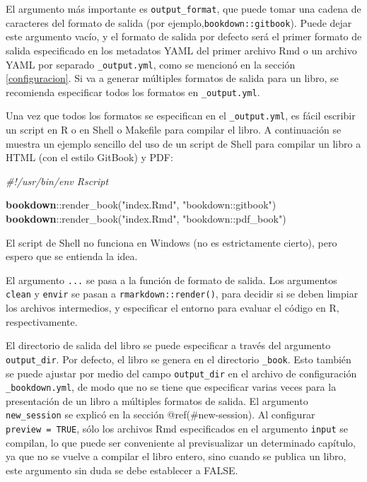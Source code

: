 \documentclass[12pt,]{krantz}
\makeatletter
\newenvironment{Shaded}{\begin{snugshade}}{\end{snugshade}}
\newcommand{\KeywordTok}[1]{\textcolor[rgb]{0.13,0.29,0.53}{\textbf{{#1}}}}
\newcommand{\StringTok}[1]{\textcolor[rgb]{0.31,0.60,0.02}{{#1}}}
\newcommand{\CommentTok}[1]{\textcolor[rgb]{0.56,0.35,0.01}{\textit{{#1}}}}
\newcommand{\NormalTok}[1]{{#1}}
\newenvironment{kframe}{%
\medskip{}
\setlength{\fboxsep}{.8em}
 \def\at@end@of@kframe{}%
 \ifinner\ifhmode%
  \def\at@end@of@kframe{\end{minipage}}%
  \begin{minipage}{\columnwidth}%
 \fi\fi%
 \def\FrameCommand##1{\hskip\@totalleftmargin \hskip-\fboxsep
 \colorbox{shadecolor}{##1}\hskip-\fboxsep
     \hskip-\linewidth \hskip-\@totalleftmargin \hskip\columnwidth}%
 \MakeFramed {\advance\hsize-\width
   \@totalleftmargin\z@ \linewidth\hsize
   \@setminipage}}%
 {\par\unskip\endMakeFramed%
 \at@end@of@kframe}
\renewenvironment{Shaded}{\begin{kframe}}{\end{kframe}}
\theoremstyle{definition}
\theoremstyle{definition}
\theoremstyle{remark}
\makeatother
\begin{document}
El argumento más importante es \texttt{output\_format}, que puede tomar
una cadena de caracteres del formato de salida (por
ejemplo,\texttt{\textquotesingle{}bookdown::gitbook\textquotesingle{}}).
Puede dejar este argumento vacío, y el formato de salida por defecto
será el primer formato de salida especificado en los metadatos YAML del
primer archivo Rmd o un archivo YAML por separado \texttt{\_output.yml},
como se mencionó en la sección \ref{configuracion}. Si va a generar
múltiples formatos de salida para un libro, se recomienda especificar
todos los formatos en \texttt{\_output.yml}.

Una vez que todos los formatos se especifican en el
\texttt{\_output.yml}, es fácil escribir un script en R o en Shell o
Makefile para compilar el libro. A continuación se muestra un ejemplo
sencillo del uso de un script de Shell para compilar un libro a HTML
(con el estilo GitBook) y PDF:

\begin{Shaded}
\begin{Highlighting}[]
\CommentTok{#!/usr/bin/env Rscript}

\KeywordTok{bookdown}\NormalTok{::render_book(}\StringTok{"index.Rmd"}\NormalTok{, }\StringTok{"bookdown::gitbook"}\NormalTok{)}
\KeywordTok{bookdown}\NormalTok{::render_book(}\StringTok{"index.Rmd"}\NormalTok{, }\StringTok{"bookdown::pdf_book"}\NormalTok{)}
\end{Highlighting}
\end{Shaded}

El script de Shell no funciona en Windows (no es estrictamente cierto),
pero espero que se entienda la idea.

El argumento \texttt{...} se pasa a la función de formato de salida. Los
argumentos \texttt{clean} y \texttt{envir} se pasan a
\texttt{rmarkdown::render()}, para decidir si se deben limpiar los
archivos intermedios, y especificar el entorno para evaluar el código en
R, respectivamente.

El directorio de salida del libro se puede especificar a través del
argumento \texttt{output\_dir}. Por defecto, el libro se genera en el
directorio \texttt{\_book}. Esto también se puede ajustar por medio del
campo \texttt{output\_dir} en el archivo de configuración
\texttt{\_bookdown.yml}, de modo que no se tiene que especificar varias
veces para la presentación de un libro a múltiples formatos de salida.
El argumento \texttt{new\_session} se explicó en la sección
@ref(\#new-session). Al configurar \texttt{preview\ =\ TRUE}, sólo los
archivos Rmd especificados en el argumento \texttt{input} se compilan,
lo que puede ser conveniente al previsualizar un determinado capítulo,
ya que no se vuelve a compilar el libro entero, sino cuando se publica
un libro, este argumento sin duda se debe establecer a FALSE.
\end{document}
